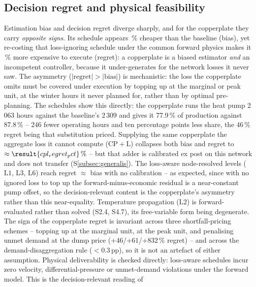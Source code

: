 \documentclass[a4paper,fleqn]{cas-dc}
\newcommand{\CPL}{\ensuremath{\mathrm{CP{+}L}}} %
\newcommand{\Lone}{\ensuremath{\mathrm{L1}}}    %
\newcommand{\Ltwo}{\ensuremath{\mathrm{L2}}}    %
\newcommand{\Lthree}{\ensuremath{\mathrm{L3}}}  %
\newcommand{\Lsix}{\ensuremath{\mathrm{L6}}}    %
\begin{document}
\subsection{Decision regret and physical feasibility}
Estimation bias and decision regret diverge sharply, and for the copperplate they
carry \emph{opposite signs}. Its schedule appears \,\% cheaper
than the baseline (bias), yet re-costing that loss-ignoring schedule under the common
forward physics makes it \,\% more expensive to execute
(regret): a copperplate is a biased estimator \emph{and} an incompetent controller,
because it under-generates for the network losses it never saw. The asymmetry
($|\text{regret}|>|\text{bias}|$) is mechanistic: the loss the copperplate omits must
be covered under execution by topping up at the marginal or peak unit, at the winter
hours it never planned for, rather than by optimal pre-planning. The schedules show this directly: the copperplate runs the heat pump 2\,063 hours against the baseline's 2\,309 and gives it 77.9\,\% of production against 87.8\,\% -- 246 fewer operating hours and ten percentage points less share, the 46\,\% regret being that substitution priced. Supplying the same
copperplate the aggregate loss it cannot compute (\CPL) collapses both bias and regret
to $\approx\result{cpl_regret_pct}\,\%$ -- but that adder is calibrated ex post on this
network and does not transfer (S\ref{subsec:generalis}). The loss-aware node-resolved levels
(\Lone, \Lthree, \Lsix) reach regret $\approx$ bias with no calibration -- as expected, since with
no ignored loss to top up the forward-minus-economic residual is a near-constant pump offset, so
the decision-relevant content is the copperplate's asymmetry rather than this near-equality.
Temperature propagation (\Ltwo) is forward-evaluated rather than solved (S2.4, S4.7), its
free-variable form being degenerate. The sign of the
copperplate regret is invariant across three shortfall-pricing schemes -- topping up at
the marginal unit, at the peak unit, and penalising unmet demand at the dump price
($+46$/$+61$/$+832$\,\% regret) -- and across the demand-disaggregation rule
($<0.3$\,pp), so it is not an artefact of either assumption. Physical deliverability is
checked directly: loss-aware schedules incur zero velocity, differential-pressure or
unmet-demand violations under the forward model. This is the decision-relevant reading of
\end{document}
